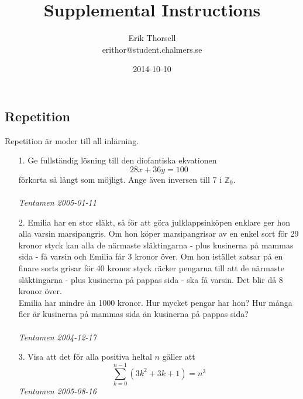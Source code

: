 \documentclass{article}
\title{Supplemental Instructions}
\author{Erik Thorsell \\ 
		\small{erithor@student.chalmers.se}
}
\date{2014-10-10}
\begin{document}
\maketitle


\subsection*{Repetition}
Repetition är moder till all inlärning.
\begin{enumerate}

\item[1.]
Ge fullständig lösning till den diofantiska ekvationen $$28x+36y=100$$ förkorta 
så långt som möjligt. Ange även inversen till 7 i $\mathbb{Z}_9$.
\\ \\ {\it Tentamen 2005-01-11}\\

\item[2.]
Emilia har en stor släkt, så för att göra julklappsinköpen enklare ger hon alla 
varsin marsipangris. Om hon köper marsipangrisar av en enkel sort för 29 kronor 
styck kan alla de närmaste släktingarna - plus kusinerna på mammas sida - få 
varsin och Emilia får 3 kronor över. Om hon istället satsar på en finare sorts 
grisar för 40 kronor styck räcker pengarna till att de närmaste släktingarna - plus 
kusinerna på pappas sida - ska få varsin. Det blir då 8 kronor över.\\ 
Emilia har mindre än 1000 kronor. Hur mycket pengar har hon? Hur många fler är 
kusinerna på mammas sida än kusinerna på pappas sida?
\\ \\{\it Tentamen 2004-12-17}\\

\item[3.]
Visa att det för alla positiva heltal $n$ gäller att 
$$\sum_{k=0}^{n-1} (3k^2+3k+1)=n^3$$
{\it Tentamen 2005-08-16}\\
\end{enumerate}
\end{document}
